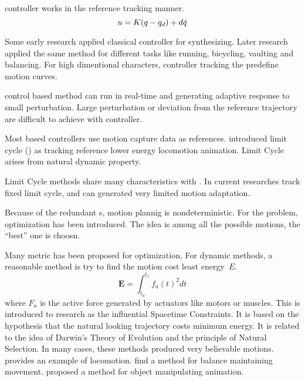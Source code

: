 \begin{itemize}

\pd controller works in the reference tracking manner.
\begin{equation}
\label{eq:pdcontrol}
u=K(q -q_d)+d\dot{q}
\end{equation}

Some early research applied classical \pd controller \citep{Raibert1991} for synthesizing.
Later research \citep{Hodgins1995} applied the same method for different tasks like running, bicycling, vaulting and balancing. 
For high dimentional characters, \pd controller tracking the predefine motion curves\citep{Yin2007}.

\pd control based method can run in real-time and generating adaptive response to small perturbation.
Large perturbation or deviation from the reference trajectory are difficult to achieve with \pd controller.








Most \pd based controllers use motion capture data as references.
\citet{Laszlo1996} introduced limit cycle (\lc) as tracking reference lower energy locomotion animation. 
Limit Cycle arises from natural dynamic property.

Limit Cycle methods share many characteristics with \pd.
In current researches\citep{Coros2009,Laszlo1996} track fixed limit cycle, and can generated very limited motion adaptation.



 


Because of the redundant \dof s, motion plannig is nondeterministic.
For the problem, optimization has been introduced.
The idea is among all the possible motions, the ``best'' one is choosn.

Many metric has been proposed for optimization, 
For dynamic methods, a reasonable method is try to find the motion cost least energy~$E$. 
\begin{equation}
 \textbf{E}=\int_{t_0}^{t_1}f_{a}(t)^2dt
\end{equation}
where $F_{a}$ is the active force generated by actuators like motors or muscles. 
This is introduced to \cms research as the influential Spacetime Constraints\citep{Witkin1988}. 
It is based on the hypothesis that the natural looking trajectory costs minimum energy. 
It is related to the idea of Darwin's Theory of Evolution and the principle of Natural Selection. 
In many cases, these methods produced very believable motions. 
\citet{Jain2009} provides an example of locomotion.  
\citet{BalanceControl} find a method for balance maintaining movement. 
\citet{Liu2009} proposed a method for object manipulating animation. 
\end{itemize}
